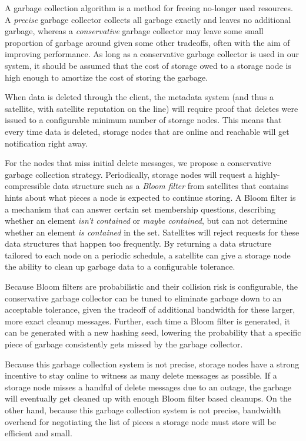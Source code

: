 \documentclass[a4paper,10pt]{article} \usepackage[utf8]{inputenc}
\begin{document}
A garbage collection algorithm is a method for freeing no-longer used resources.
A {\em precise} garbage collector collects all garbage exactly and
leaves no additional garbage, whereas a {\em conservative} garbage collector may
leave some small proportion of garbage around given some other tradeoffs,
often with the aim of improving performance.
As long as a conservative garbage collector is used in our system, it should
be assumed that the cost of storage owed to a storage node is high enough
to amortize the cost of storing the garbage.

When data is deleted through the client, the metadata system (and thus a
satellite, with satellite reputation on the line) will require proof that
deletes were issued to a configurable minimum number of storage nodes.
This means that every time
data is deleted, storage nodes that are online and reachable will get
notification right away.

For the nodes that miss initial delete messages, we propose a conservative
garbage collection strategy. Periodically, storage nodes will request
a highly-compressible data structure such as a
{\em Bloom filter} \cite{bloom-filter} from satellites that contains hints about
what pieces a node is expected to continue storing.
A Bloom filter is a mechanism that can
answer certain set membership questions, describing whether an element
{\em isn't contained} or
{\em maybe contained}, but can not determine whether an element
{\em is contained} in the set.
Satellites will reject
requests for these data structures that happen too frequently.
By returning a data
structure tailored to each node on a periodic schedule, a satellite can give a
storage node the ability to clean up garbage data to a configurable tolerance.

Because Bloom filters are probabilistic and their collision risk is
configurable, the conservative garbage collector can be tuned to eliminate
garbage down to an acceptable tolerance, given the tradeoff of additional
bandwidth for these larger, more exact cleanup messages. Further, each time a
Bloom filter is generated, it can be generated with a new hashing seed, lowering
the probability that a specific piece of garbage consistently gets
missed by the garbage collector.

Because this garbage collection system is not precise, storage nodes have a
strong incentive to stay online to witness as many delete messages as possible.
If a storage node misses a handful of delete messages due to an outage, the
garbage will eventually get cleaned up with enough Bloom filter based cleanups.
On the other hand, because this garbage collection system is not precise,
bandwidth overhead for negotiating the list of pieces a storage node must store
will be efficient and small.
\end{document}
